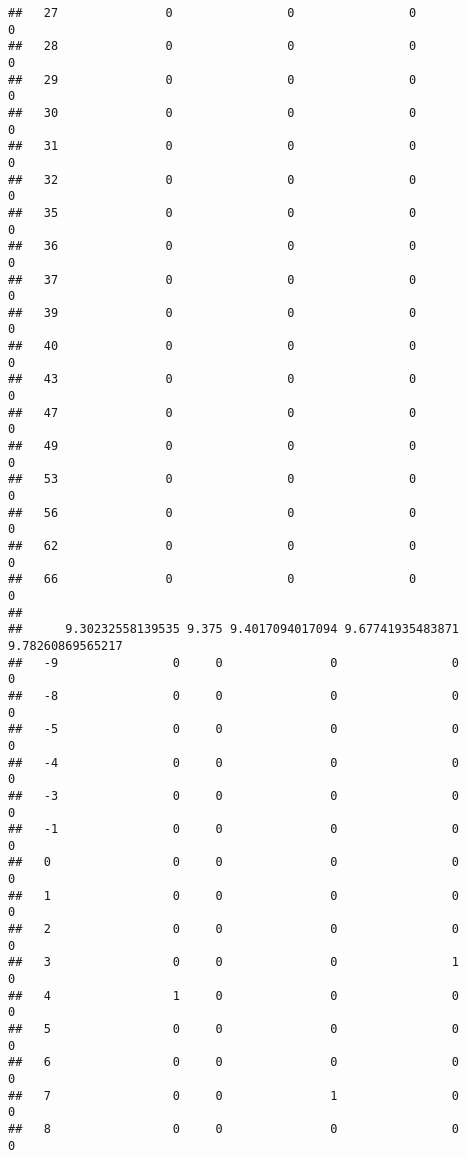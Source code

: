\documentclass[]{article}
\begin{document}
\begin{verbatim}
##   27               0                0                0                0
##   28               0                0                0                0
##   29               0                0                0                0
##   30               0                0                0                0
##   31               0                0                0                0
##   32               0                0                0                0
##   35               0                0                0                0
##   36               0                0                0                0
##   37               0                0                0                0
##   39               0                0                0                0
##   40               0                0                0                0
##   43               0                0                0                0
##   47               0                0                0                0
##   49               0                0                0                0
##   53               0                0                0                0
##   56               0                0                0                0
##   62               0                0                0                0
##   66               0                0                0                0
##     
##      9.30232558139535 9.375 9.4017094017094 9.67741935483871 9.78260869565217
##   -9                0     0               0                0                0
##   -8                0     0               0                0                0
##   -5                0     0               0                0                0
##   -4                0     0               0                0                0
##   -3                0     0               0                0                0
##   -1                0     0               0                0                0
##   0                 0     0               0                0                0
##   1                 0     0               0                0                0
##   2                 0     0               0                0                0
##   3                 0     0               0                1                0
##   4                 1     0               0                0                0
##   5                 0     0               0                0                0
##   6                 0     0               0                0                0
##   7                 0     0               1                0                0
##   8                 0     0               0                0                0

\end{verbatim}
\end{document}
